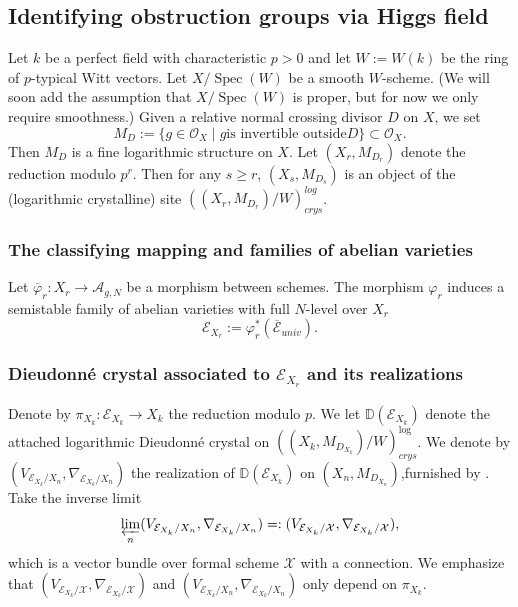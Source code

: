 \documentclass[12pt,twoside]{book}
\theoremstyle{plain}
\theoremstyle{definition}
\theoremstyle{remark}
\DeclareMathOperator\Spec{Spec}
\numberwithin{equation}{section}
\begin{document}
\subsection{Identifying obstruction groups via Higgs field}
Let $k$ be a perfect field with characteristic $p>0$ and let $W:=W(k)$ be the ring of $p$-typical Witt vectors. Let $X/\Spec(W)$ be a smooth $W$-scheme. (We will soon add the assumption that $X/\Spec(W)$ is proper, but for now we only require smoothness.) Given a relative normal crossing divisor $D$ on $X$, we set
\[M_D := \{g \in \mathcal O_X \mid g \text{is invertible outside} D\} \subset \mathcal O_X.\]
Then $M_D$ is a fine logarithmic structure on $X$. Let $(X_r,M_{D_r})$ denote the reduction modulo $p^r$. Then for any $s\geq r$, $(X_s,M_{D_s})$ is an object of the (logarithmic crystalline) site $((X_r,M_{D_r})/W)_{crys}^{log}$.

\subsubsection{The classifying mapping and families of abelian varieties}

Let $\overline{\varphi}_r: X_r \rightarrow {\mathcal A_{g,N}}$ be a morphism between schemes. The morphism $\varphi_r$ induces a semistable family of abelian varieties with full $N$-level over $X_r$
\[\mathcal E_{X_r}:=\varphi_r^*(\overline{\mathcal E}_{univ}).\]

\subsubsection{Dieudonn\'e crystal associated to $\mathcal E_{X_r}$ and its realizations}
Denote by $\pi_{{X_k}}\colon \mathcal E_{{X_k}} \rightarrow {X_k}$ the reduction modulo $p$. We let $\mathbb D(\mathcal E_{{X_k}})$ denote the attached logarithmic Dieudonn\'e crystal on $(({X_k},M_{D_{{X_k}}})/W)^{\log}_{crys}$. We denote by $(V_{\mathcal E_{{X_k}}/X_n},\nabla_{\mathcal E_{{X_k}}/X_n})$ the realization of $\mathbb D(\mathcal E_{{X_k}})$ on $(X_n,M_{D_{X_n}})$,furnished by \cite[Theorem 6.2(b) on p. 218]{Kat89}. Take the inverse limit
\[\varprojlim\limits_n (V_{\mathcal E_{{X_k}}/X_n},\nabla_{\mathcal E_{{X_k}}/X_n}) =: (V_{\mathcal E_{{X_k}}/\mathcal X},\nabla_{\mathcal E_{{X_k}}/\mathcal X}),\]
which is a vector bundle over formal scheme $\mathcal X$ with a connection.
We emphasize that $(V_{\mathcal E_{{X_k}}/\mathcal X},\nabla_{\mathcal E_{{X_k}}/\mathcal X})$ and $(V_{\mathcal E_{{X_k}}/X_n},\nabla_{\mathcal E_{{X_k}}/X_n})$ only depend on $\pi_{{X_k}}$.
\end{document}
